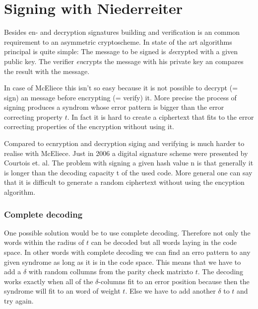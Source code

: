 

\section{Signing with Niederreiter}
\label{signature}
Besides en- and decryption signatures building and verification is an common requirement to an asymmetric cryptoscheme. In state of the art algorithms principal is quite simple: The message to be signed is \textit{de}crypted with a given public key. The verifier \textit{en}crypts the message with his private key an compares the result with the message. 

In case of McEliece this isn't so easy because it is not possible to decrypt (= sign) an message before encrypting (= verify) it. More precise the process of signing produces a syndrom whose  error pattern is bigger than the error correcting property $t$. In fact it is hard to create a ciphertext that fits to the error correcting properties of the encryption without using it. 


Compared to ecnryption and decryption siging and verifying is much harder to realise with McEliece. Just in 2006 a digital signature scheme were presented by Courtois et. al. 
The problem with signing a given hash value n is that generally it is longer than the decoding capacity t of the used code. More general one can say that it is difficult to generate a random ciphertext without using the encyption algorithm. \cite{courtois2001achieve}


\subsubsection*{Complete decoding}
One possible solution would be to use complete decoding. Therefore not only the words within the radius of $t$ can be decoded but all words laying in the code space. In other words with complete decoding we can find an erro pattern to any given syndrome as long as it is in the code space. This means that we have to add a $\delta$ with random collumns from the parity check matrixto $t$. The decoding works exactly when all of the $\delta$-columns fit to an error position because then the syndrome will fit to an word of weight $t$. Else we have to add another $\delta$ to $t$ and try again.

